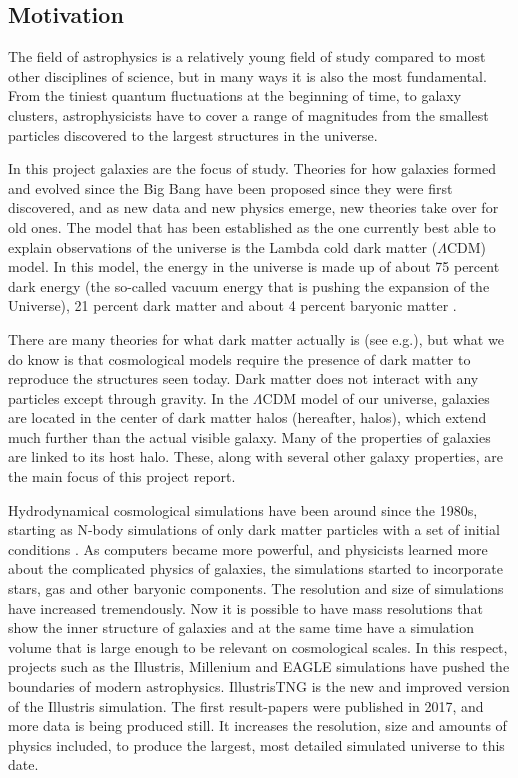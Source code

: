 
\noindent
\subsection{Motivation}
The field of astrophysics is a relatively young field of study compared to most other disciplines of science, but in many ways it is also the most fundamental. From the tiniest quantum fluctuations at the beginning of time, to galaxy clusters, astrophysicists have to cover a range of magnitudes from the smallest particles discovered to the largest structures in the universe. 

In this project galaxies are the focus of study. Theories for how galaxies formed and evolved since the Big Bang have been proposed since they were first discovered, and as new data and new physics emerge, new theories take over for old ones. The model that has been established as the one currently best able to explain observations of the universe is the Lambda cold dark matter ($\Lambda$CDM) model. In this model, the energy in the universe is made up of about 75 percent dark energy (the so-called vacuum energy that is pushing the expansion of the Universe), 21 percent dark matter and about 4 percent baryonic matter \parencite{white}. 

There are many theories for what dark matter actually is (see e.g.\cite{Boveia2018}), but what we do know is that cosmological models require the presence of dark matter to reproduce the structures seen today. Dark matter does not interact with any particles except through gravity. In the $\Lambda$CDM model of our universe, galaxies are located in the center of dark matter halos (hereafter, halos), which extend much further than the actual visible galaxy. Many of the properties of galaxies are linked to its host halo. These, along with several other galaxy properties, are the main focus of this project report.

Hydrodynamical cosmological simulations have been around since the 1980s, starting as N-body simulations of only dark matter particles with a set of initial conditions \parencite{Frenk1983}. As computers became more powerful, and physicists learned more about the complicated physics of galaxies, the simulations started to incorporate stars, gas and other baryonic components. The resolution and size of simulations have increased tremendously. Now it is possible to have mass resolutions that show the inner structure of galaxies and at the same time have a simulation volume that is large enough to be relevant on cosmological scales. In this respect, projects such as the Illustris, Millenium and EAGLE simulations have pushed the boundaries of modern astrophysics. IllustrisTNG is the new and improved version of the Illustris simulation. The first result-papers were published in 2017, and more data is being produced still. It increases the resolution, size and amounts of physics included, to produce the largest, most detailed simulated universe to this date. 

